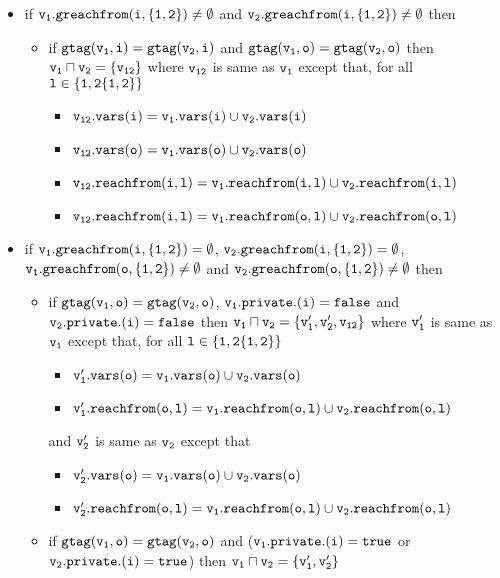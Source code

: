  \begin{itemize}
 \item if $\tt v_1.greachfrom(i,\{1,2\}) \neq \emptyset$ and $\tt v_2.greachfrom(i,\{1,2\}) \neq \emptyset$ then 
  \begin{itemize}
  \item if $\tt gtag(v_1, i) = gtag(v_2, i)$ and $\tt gtag(v_1, o) = gtag(v_2, o)$ then $\tt v_1 \sqcap v_2 = \{v_{12}\}$ where $\tt v_{12}$ is same as $\tt v_1$ except that, for all $\tt l \in \{1,2 \{1,2\}\}$ 
  \begin{itemize}
  \item $\tt v_{12}.vars(i) = v_1.vars(i) \cup v_2.vars(i)$ 
  \item  $\tt v_{12}.vars(o) = v_1.vars(o) \cup v_2.vars(o)$
  \item $\tt v_{12}.reachfrom(i,l) = v_{1}.reachfrom(i,l) \cup v_{2}.reachfrom(i,l)$
   \item $\tt v_{12}.reachfrom(i,l) = v_{1}.reachfrom(o,l) \cup v_{2}.reachfrom(o,l)$
    \end{itemize}
 \end{itemize}

 \item if $\tt v_1.greachfrom(i,\{1,2\}) = \emptyset$, $\tt v_2.greachfrom(i,\{1,2\}) = \emptyset$, $\tt v_1.greachfrom(o,\{1,2\}) \neq \emptyset$ and $\tt v_2.greachfrom(o,\{1,2\}) \neq \emptyset$ then 
  \begin{itemize}
  \item if $\tt gtag(v_1, o) = gtag(v_2, o)$, $\tt v_1.private.(i) = false$ and $\tt v_2.private.(i) = false$ then $\tt v_1 \sqcap v_2 = \{v_1', v_2', v_{12}\}$ where %
  $\tt v_1'$ is same as $\tt v_1$ except that, for all $\tt l \in \{1,2 \{1,2\}\}$
    \begin{itemize}
  \item  $\tt v_1'.vars(o) = v_1.vars(o) \cup v_2.vars(o)$
  \item $\tt v_1'.reachfrom(o,l) = v_{1}.reachfrom(o,l) \cup v_{2}.reachfrom(o,l)$
    \end{itemize}
   and $\tt v_2'$ is same as $\tt v_2$ except that 
    \begin{itemize}
  \item  $\tt v_2'.vars(o) = v_1.vars(o) \cup v_2.vars(o)$
  \item $\tt v_2'.reachfrom(o,l) = v_{1}.reachfrom(o,l) \cup v_{2}.reachfrom(o,l)$
    \end{itemize}
     \item if $\tt gtag(v_1, o) = gtag(v_2, o)$ and ($\tt v_1.private.(i) = true$ or $\tt v_2.private.(i) = true$) then $\tt v_1 \sqcap v_2 = \{v_1', v_2'\}$ 
 \end{itemize}
 

\end{itemize}
